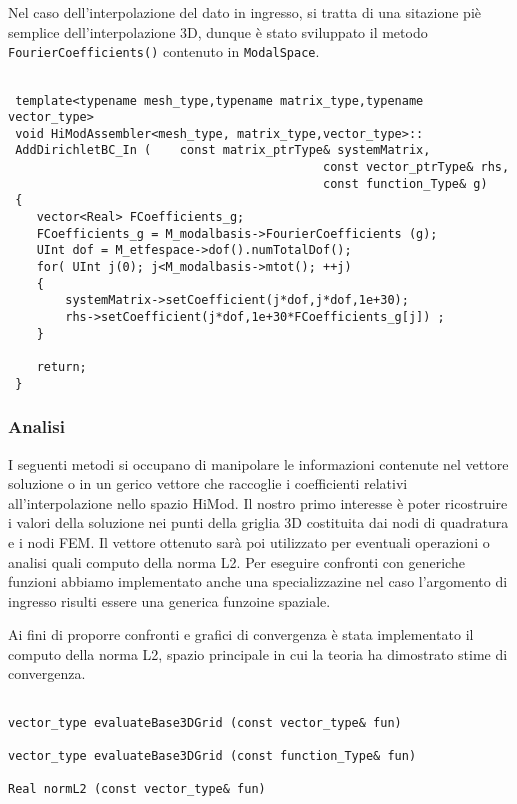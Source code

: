 Nel caso dell'interpolazione del dato in ingresso, si tratta di una sitazione pi\`e semplice dell'interpolazione 3D, dunque \`e stato sviluppato il metodo \texttt{FourierCoefficients()} contenuto in \texttt{ModalSpace}.
\begin{lstlisting}[style = general]

 template<typename mesh_type,typename matrix_type,typename vector_type>
 void HiModAssembler<mesh_type, matrix_type,vector_type>::
 AddDirichletBC_In (	const matrix_ptrType& systemMatrix,
 											const vector_ptrType& rhs,
 											const function_Type& g)
 {
 	vector<Real> FCoefficients_g;
 	FCoefficients_g = M_modalbasis->FourierCoefficients (g);
 	UInt dof = M_etfespace->dof().numTotalDof();
 	for( UInt j(0); j<M_modalbasis->mtot(); ++j)
 	{
		systemMatrix->setCoefficient(j*dof,j*dof,1e+30);
		rhs->setCoefficient(j*dof,1e+30*FCoefficients_g[j]) ;
 	}
 	
 	return;
 }
\end{lstlisting}

\subsubsection{Analisi}

I seguenti metodi si occupano di manipolare le informazioni contenute nel vettore soluzione o in un gerico vettore che raccoglie i coefficienti relativi all'interpolazione nello spazio HiMod. Il nostro primo interesse \`e poter ricostruire i valori della soluzione nei punti della griglia 3D costituita dai nodi di quadratura e i nodi FEM. Il vettore ottenuto sar\`a poi utilizzato per eventuali operazioni o analisi quali computo della norma L2.
Per eseguire confronti con generiche funzioni abbiamo implementato anche una specializzazine nel caso l'argomento di ingresso risulti essere una generica funzoine spaziale.

Ai fini di proporre confronti e grafici di convergenza \`e stata implementato il computo della norma L2, spazio principale in cui la teoria ha dimostrato stime di convergenza.

\begin{lstlisting}[style = general,frame=none]

vector_type evaluateBase3DGrid (const vector_type& fun)

vector_type evaluateBase3DGrid (const function_Type& fun)

Real normL2 (const vector_type& fun)

\end{lstlisting}

